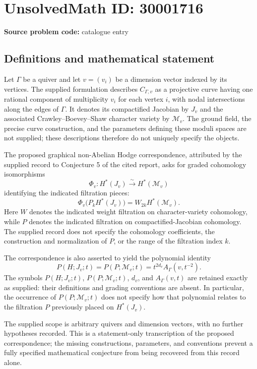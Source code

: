 \documentclass[11pt]{article}
\begin{document}
\section*{UnsolvedMath ID: 30001716}
\textbf{Source problem code:} catalogue entry
\subsection{Definitions and mathematical statement}
Let \(\Gamma\) be a quiver and let \(v=(v_i)\) be a dimension vector indexed by its vertices. The supplied formulation describes \(C_{\Gamma,v}\) as a projective curve having one rational component of multiplicity \(v_i\) for each vertex \(i\), with nodal intersections along the edges of \(\Gamma\). It denotes its compactified Jacobian by \(J_v\) and the associated Crawley--Boevey--Shaw character variety by \(\mathcal M_v\). The ground field, the precise curve construction, and the parameters defining these moduli spaces are not supplied; these descriptions therefore do not uniquely specify the objects.

The proposed graphical non-Abelian Hodge correspondence, attributed by the supplied record to Conjecture 5 of the cited report, asks for graded cohomology isomorphisms
\[
\Phi_v:H^*(J_v)\xrightarrow{\sim}H^*(\mathcal M_v)
\]
identifying the indicated filtration pieces:
\[
\Phi_v\bigl(P_kH^*(J_v)\bigr)=W_{2k}H^*(\mathcal M_v).
\]
Here \(W\) denotes the indicated weight filtration on character-variety cohomology, while \(P\) denotes the indicated filtration on compactified-Jacobian cohomology. The supplied record does not specify the cohomology coefficients, the construction and normalization of \(P\), or the range of the filtration index \(k\).

The correspondence is also asserted to yield the polynomial identity
\[
P(H;J_v;t)=P(P;\mathcal M_v;t)
=t^{2d_v}A_\Gamma(v,t^{-2}).
\]
The symbols \(P(H;J_v;t)\), \(P(P;\mathcal M_v;t)\), \(d_v\), and \(A_\Gamma(v,t)\) are retained exactly as supplied: their definitions and grading conventions are absent. In particular, the occurrence of \(P(P;\mathcal M_v;t)\) does not specify how that polynomial relates to the filtration \(P\) previously placed on \(H^*(J_v)\).

The supplied scope is arbitrary quivers and dimension vectors, with no further hypotheses recorded. This is a statement-only transcription of the proposed correspondence; the missing constructions, parameters, and conventions prevent a fully specified mathematical conjecture from being recovered from this record alone.
\end{document}
